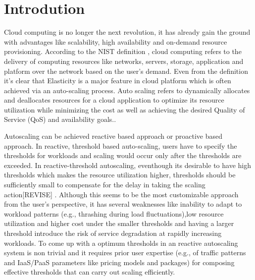\section{Introdution}

Cloud computing is no longer the next revolution, it has already gain the ground with advantages like scalability, high availability and on-demand resource provisioning. According to the NIST definition \cite{Mell_2011} ,  cloud computing refers to the delivery of computing resources like networks, servers, storage, application and platform over the network based on the user’s demand. Even from the definition it’s clear that Elasticity is a major feature in cloud platform which is often achieved via an auto-scaling process. Auto scaling refers to  dynamically allocates and deallocates resources for a cloud application to optimize its resource utilization while minimizing the cost as well as achieving the desired Quality of Service (QoS) and availability goals.\cite{Roy_2011}\cite{Armbrust_2010}.

Autoscaling can be achieved  reactive based approach or proactive based approach. In reactive, threshold based auto-scaling, users have to specify the thresholds for workloads  and scaling would occur only after the thresholds are exceeded\cite{Lorido_Botran_2014}. In reactive-threshold autoscaling, eventhough its desirable to have high thresholds which makes the resource utilization higher, thresholds should be sufficiently small to compensate for the delay in taking the scaling action[REVISE] .    Although this seems to be the most customizable approach from the user’s perspective, it has several weaknesses \cite{Alipour:2014:AAI:2735522.2735532} like inability to adapt to workload patterns (e.g., thrashing during load fluctuations),low resource utilization and higher cost under the smaller thresholds and having a larger threshold introduce the risk of service degradation at rapidly increasing workloads. To come up with a optimum thresholds in an reactive autoscaling system is non trivial and it requires prior user expertise (e.g., of traffic patterns and IaaS/PaaS parameters like pricing models and packages) for composing effective thresholds that can carry out scaling efficiently.

